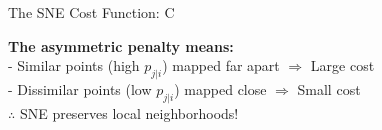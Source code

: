 \documentclass{beamer}
\begin{document}
\begin{frame}{The SNE Cost Function: C}
\vspace{0.3cm}
\begin{center}
\colorbox{highlight!20}{
\begin{minipage}{0.85\textwidth}
\centering
\footnotesize\textbf{The asymmetric penalty means:}\\
- Similar points (high $p_{j|i}$) mapped far apart $\Rightarrow$ Large cost\\
- Dissimilar points (low $p_{j|i}$) mapped close $\Rightarrow$ Small cost\\
$\therefore$ SNE preserves local neighborhoods!
\end{minipage}
}
\end{center}
\end{frame}
\end{document}
